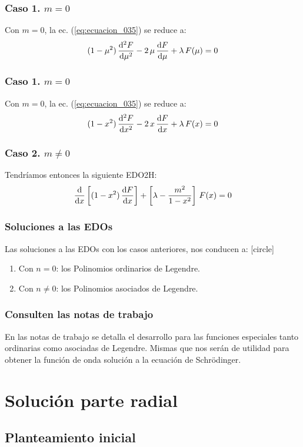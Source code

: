 \documentclass[12pt]{beamer}
\begin{document}
\begin{frame}
\frametitle{Caso 1. $m = 0$}
Con $m = 0$, la ec. (\ref{eq:ecuacion_035}) se reduce a:
\begin{align}
    (1 - \mu^{2}) \, \dv[2]{F}{\mu} - 2  \, \mu \, \dv{F}{\mu} + \lambda \, F(\mu) = 0
    \label{eq:ecuacion_036a}
\end{align}
\end{frame}
\begin{frame}
\frametitle{Caso 1. $m = 0$}
Con $m = 0$, la ec. (\ref{eq:ecuacion_035}) se reduce a:
\begin{align}
    (1 - x^{2}) \, \dv[2]{F}{x} - 2  \, x \, \dv{F}{x} + \lambda \, F(x) = 0
    \label{eq:ecuacion_036b}
\end{align}
\end{frame}
\begin{frame}
\frametitle{Caso 2. $m \neq 0$}
Tendríamos entonces la siguiente EDO2H:
\begin{align}
\dv{x} \left[ (1 - x^{2}) \, \dv{F}{x} \right] + \left[ \lambda - \dfrac{m^{2}}{1 - x^{2}} \right] \, F(x) = 0
\label{eq:ecuacion_037}
\end{align}
\end{frame}
\begin{frame}
\frametitle{Soluciones a las EDOs}
Las soluciones a las EDOs con los casos anteriores, nos conducen a:
\pause
{}
[circle]
\begin{enumerate}[<+->]
\item Con $n = 0$: los Polinomios ordinarios de Legendre.
\item Con $n \neq 0$: los Polinomios asociados de Legendre.
\end{enumerate}
\end{frame}
\begin{frame}
\frametitle{Consulten las notas de trabajo}
En las notas de trabajo se detalla el desarrollo para las funciones especiales tanto ordinarias como asociadas de Legendre.
\pause
Mismas que nos serán de utilidad para obtener la función de onda solución a la ecuación de Schrödinger.
\end{frame}

\section{Solución parte radial}
\subsection{Planteamiento inicial}
\end{document}
